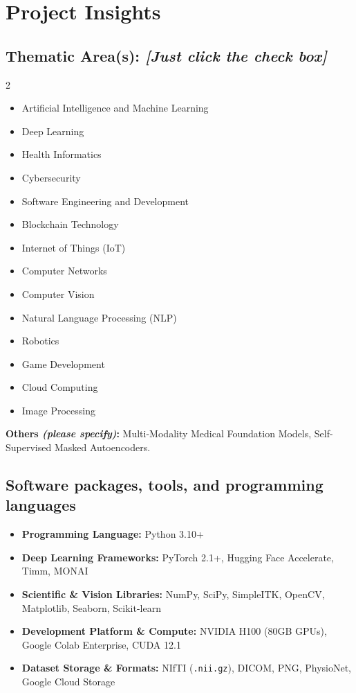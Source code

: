 \documentclass[11pt,a4paper]{article}
\begin{document}
\vspace{0.2cm}

\section*{Project Insights}

\subsection*{Thematic Area(s): \textit{\small [Just click the check box]}}
\begin{multicols}{2}
\begin{itemize}[label=\square]
    \item[\textbf{[\checked]}] Artificial Intelligence and Machine Learning
    \item[\textbf{[\checked]}] Deep Learning
    \item[\textbf{[\checked]}] Health Informatics
    \item Cybersecurity
    \item Software Engineering and Development
    \item Blockchain Technology
    \item Internet of Things (IoT)
    \item Computer Networks
    \item[\textbf{[\checked]}] Computer Vision
    \item Natural Language Processing (NLP)
    \item Robotics
    \item Game Development
    \item[\textbf{[\checked]}] Cloud Computing
    \item[\textbf{[\checked]}] Image Processing
\end{itemize}
\end{multicols}
\noindent \textbf{Others \textit{(please specify)}:} Multi-Modality Medical Foundation Models, Self-Supervised Masked Autoencoders.

\subsection*{Software packages, tools, and programming languages}
\begin{itemize}[leftmargin=*]
    \item \textbf{Programming Language:} Python 3.10+
    \item \textbf{Deep Learning Frameworks:} PyTorch 2.1+, Hugging Face Accelerate, Timm, MONAI
    \item \textbf{Scientific \& Vision Libraries:} NumPy, SciPy, SimpleITK, OpenCV, Matplotlib, Seaborn, Scikit-learn
    \item \textbf{Development Platform \& Compute:} NVIDIA H100 (80GB GPUs), Google Colab Enterprise, CUDA 12.1
    \item \textbf{Dataset Storage \& Formats:} NIfTI (\texttt{.nii.gz}), DICOM, PNG, PhysioNet, Google Cloud Storage
\end{itemize}
\end{document}
